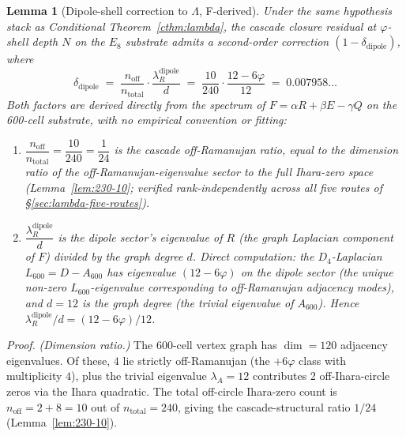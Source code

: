 \documentclass[11pt]{article}
\theoremstyle{plain}
\newtheorem{lemma}[theorem]{Lemma}
\theoremstyle{definition}
\theoremstyle{remark}
\begin{document}
\begin{lemma}[Dipole-shell correction to $\Lambda$, F-derived]\label{lem:dipole}
Under the same hypothesis stack as Conditional Theorem~\ref{cthm:lambda}, the cascade closure residual at $\varphi$-shell depth $N$ on the $E_8$ substrate admits a second-order correction $(1 - \delta_\mathrm{dipole})$, where
\[
  \delta_\mathrm{dipole} \;=\; \frac{n_\mathrm{off}}{n_\mathrm{total}} \cdot \frac{\lambda_R^\mathrm{dipole}}{d} \;=\; \frac{10}{240} \cdot \frac{12 - 6\varphi}{12} \;=\; 0.007958\ldots
\]
Both factors are derived directly from the spectrum of $F = \alpha R + \beta E - \gamma Q$ on the 600-cell substrate, with no empirical convention or fitting:
\begin{enumerate}[leftmargin=2em]
\item $\dfrac{n_\mathrm{off}}{n_\mathrm{total}} = \dfrac{10}{240} = \dfrac{1}{24}$ is the cascade off-Ramanujan ratio, equal to the dimension ratio of the off-Ramanujan-eigenvalue sector to the full Ihara-zero space (Lemma~\ref{lem:230-10}; verified rank-independently across all five routes of \S\ref{sec:lambda-five-routes}).
\item $\dfrac{\lambda_R^\mathrm{dipole}}{d}$ is the dipole sector's eigenvalue of $R$ (the graph Laplacian component of $F$) divided by the graph degree $d$. Direct computation: the $D_4$-Laplacian $L_{600} = D - A_{600}$ has eigenvalue $(12 - 6\varphi)$ on the dipole sector (the unique non-zero $L_{600}$-eigenvalue corresponding to off-Ramanujan adjacency modes), and $d = 12$ is the graph degree (the trivial eigenvalue of $A_{600}$). Hence $\lambda_R^\mathrm{dipole}/d = (12 - 6\varphi)/12$.
\end{enumerate}
\end{lemma}

\noindent\emph{Proof.}
\emph{(Dimension ratio.)} The 600-cell vertex graph has $\dim = 120$ adjacency eigenvalues. Of these, $4$ lie strictly off-Ramanujan (the $+6\varphi$ class with multiplicity $4$), plus the trivial eigenvalue $\lambda_A = 12$ contributes 2 off-Ihara-circle zeros via the Ihara quadratic. The total off-circle Ihara-zero count is $n_\mathrm{off} = 2 + 8 = 10$ out of $n_\mathrm{total} = 240$, giving the cascade-structural ratio $1/24$ (Lemma~\ref{lem:230-10}).
\end{document}
